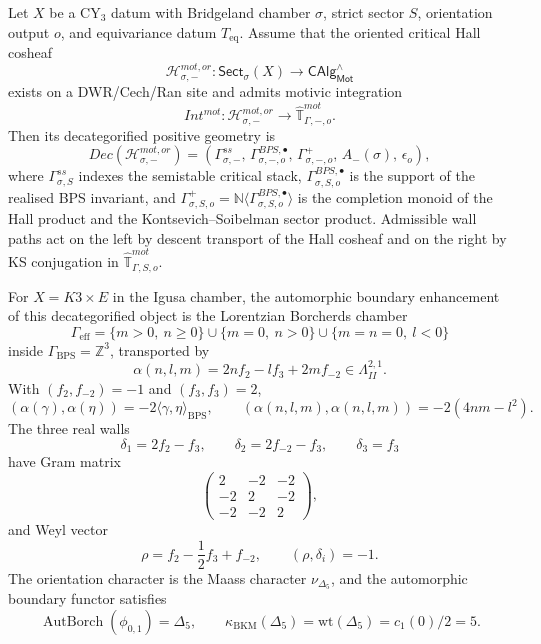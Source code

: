 \begin{theorem}
\label{gluing:thm:positive-cone-descent-index}
Let \(X\) be a CY$_3$ datum with Bridgeland chamber \(\sigma\), strict
sector \(S\), orientation output \(o\), and equivariance datum
\(T_{\mathrm{eq}}\). Assume that the oriented critical Hall cosheaf
\[
 \mathcal H^{mot,or}_{\sigma,-}\colon
 \mathsf{Sect}_{\sigma}(X)\longrightarrow
 \mathsf{CAlg}^{\wedge}_{\mathsf{Mot}}
\]
exists on a DWR/Cech/Ran site and admits motivic integration
\[
 Int^{mot}\colon \mathcal H^{mot,or}_{\sigma,-}
 \longrightarrow \widehat{\mathbb T}^{mot}_{\Gamma,-,o}.
\]
Then its decategorified positive geometry is
\[
 Dec(\mathcal H^{mot,or}_{\sigma,-})
 =
 (\Gamma^{ss}_{\sigma,-},\,
 \Gamma^{BPS,\bullet}_{\sigma,-,o},\,
 \Gamma^{+}_{\sigma,-,o},\,
 A_{-}(\sigma),\,
 \epsilon_o),
\]
where \(\Gamma^{ss}_{\sigma,S}\) indexes the semistable critical stack,
\(\Gamma^{BPS,\bullet}_{\sigma,S,o}\) is the support of the realised BPS
invariant, and \(\Gamma^{+}_{\sigma,S,o}=
\mathbb N\langle\Gamma^{BPS,\bullet}_{\sigma,S,o}\rangle\) is the
completion monoid of the Hall product and the Kontsevich--Soibelman
sector product. Admissible wall paths act on the left by descent
transport of the Hall cosheaf and on the right by KS conjugation in
\(\widehat{\mathbb T}^{mot}_{\Gamma,S,o}\).

For \(X=K3\times E\) in the Igusa chamber, the automorphic boundary
enhancement of this decategorified object is the Lorentzian Borcherds
chamber
\[
 \Gamma_{\mathrm{eff}}
 =
 \{m>0,\ n\ge0\}\cup\{m=0,\ n>0\}\cup\{m=n=0,\ l<0\}
\]
inside \(\Gamma_{\mathrm{BPS}}=\mathbb Z^{3}\), transported by
\[
 \alpha(n,l,m)=2nf_{2}-lf_{3}+2mf_{-2}
 \in \Lambda^{2,1}_{II}.
\]
With \((f_2,f_{-2})=-1\) and \((f_3,f_3)=2\),
\[
 (\alpha(\gamma),\alpha(\eta))
 =
 -2\langle\gamma,\eta\rangle_{\mathrm{BPS}},\qquad
 (\alpha(n,l,m),\alpha(n,l,m))=-2(4nm-l^{2}).
\]
The three real walls
\[
 \delta_1=2f_2-f_3,\qquad
 \delta_2=2f_{-2}-f_3,\qquad
 \delta_3=f_3
\]
have Gram matrix
\[
\begin{pmatrix}
2&-2&-2\\
-2&2&-2\\
-2&-2&2
\end{pmatrix},
\]
and Weyl vector
\[
 \rho=f_2-\frac12 f_3+f_{-2},\qquad (\rho,\delta_i)=-1.
\]
The orientation character is the Maass character \(\nu_{\Delta_5}\), and
the automorphic boundary functor satisfies
\[
 \operatorname{AutBorch}(\phi_{0,1})=\Delta_5,\qquad
 \kappa_{\mathrm{BKM}}(\Delta_5)
 =\mathrm{wt}(\Delta_5)=c_1(0)/2=5.
\]
\end{theorem}

